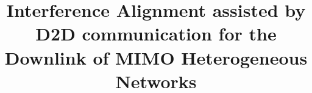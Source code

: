 \documentclass[journal]{IEEEtran}
\begin{document}
%
\title{Interference Alignment assisted by D2D communication for the Downlink of MIMO Heterogeneous Networks}
%
%
%

% 
%



% 
\end{document}
